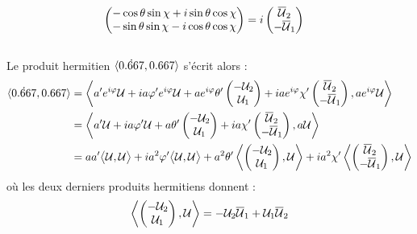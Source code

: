 \begin{demo}
\begin{align*}
		\begin{pmatrix} -\cos\theta \sin\chi + i\sin\theta \cos\chi \\ -\sin\theta \sin\chi - i\cos\theta \cos\chi \end{pmatrix} &= i\begin{pmatrix} \overline{\mathcal{U}}_2 \\ -\overline{\mathcal{U}}_1 \end{pmatrix}
	\end{align*}
	\\
	Le produit hermitien $\langle \dot{\x}, \x \rangle$ s'écrit alors :
	\begin{align*}
		\langle \dot{\x}, \x \rangle 
		&= \left\langle a'e^{i\varphi}\mathcal{U} + ia\varphi'e^{i\varphi} \mathcal{U} + ae^{i\varphi}\theta'\begin{pmatrix} -\mathcal{U}_2 \\ \mathcal{U}_1 \end{pmatrix} + iae^{i\varphi}\chi'\begin{pmatrix} \congu{\mathcal{U}}_2 \\ -\congu{\mathcal{U}}_1 \end{pmatrix}, ae^{i\varphi}\mathcal{U} \right\rangle \\
		&= \left\langle a'\mathcal{U} + ia\varphi' \mathcal{U} + a\theta'\begin{pmatrix} -\mathcal{U}_2 \\ \mathcal{U}_1 \end{pmatrix} + ia\chi'\begin{pmatrix} \congu{\mathcal{U}}_2 \\ -\congu{\mathcal{U}}_1 \end{pmatrix}, a\mathcal{U} \right\rangle \\
		&= aa' \big\langle \mathcal{U}, \mathcal{U}\big\rangle  + ia^2\varphi' \big\langle \mathcal{U}, \mathcal{U}\big\rangle  + a^2\theta'\left\langle \begin{pmatrix} -\mathcal{U}_2 \\ \mathcal{U}_1 \end{pmatrix}, \mathcal{U} \right\rangle + ia^2\chi'\left\langle \begin{pmatrix} \congu{\mathcal{U}}_2 \\ -\congu{\mathcal{U}}_1 \end{pmatrix}, \mathcal{U} \right\rangle
	\end{align*}
	où les deux derniers produits hermitiens donnent :
	\begin{align*}
		\left\langle \begin{pmatrix} -\mathcal{U}_2 \\ \mathcal{U}_1 \end{pmatrix}, \mathcal{U} \right\rangle &= -\mathcal{U}_2\congu{\mathcal{U}}_1 + \mathcal{U}_1\congu{\mathcal{U}}_2 \\

\end{align*}
\end{demo}
